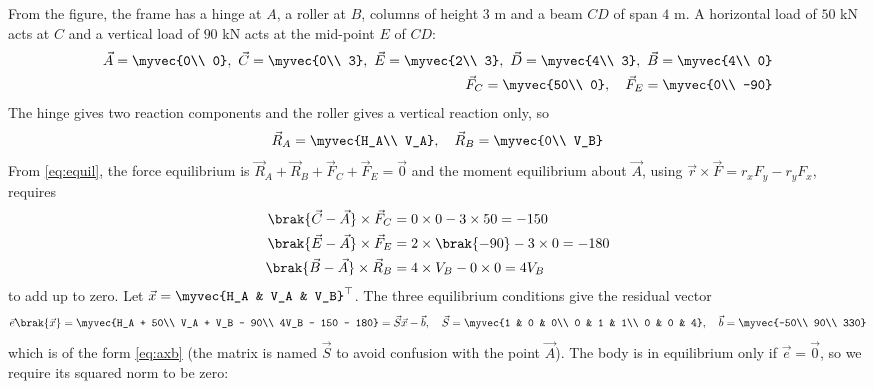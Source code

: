 \begin{enumerate}[label=\thesubsection.\arabic*, ref=\thesubsection.\theenumi, itemsep=0pt, leftmargin=*]
\solution From the figure, the frame has a hinge at $A$, a roller at $B$, columns of height $3$ m and a beam $CD$ of span $4$ m. A horizontal load of $50$ kN acts at $C$ and a vertical load of $90$ kN acts at the mid-point $E$ of $CD$:
\begin{align}
\vec{A} = \myvec{0\\ 0},\ \vec{C} = \myvec{0\\ 3},\ \vec{E} = \myvec{2\\ 3},\ \vec{D} = \myvec{4\\ 3},\ \vec{B} = \myvec{4\\ 0}\\
\vec{F}_C = \myvec{50\\ 0},\quad \vec{F}_E = \myvec{0\\ -90}
\end{align}
The hinge gives two reaction components and the roller gives a vertical reaction only, so
\begin{align}
\vec{R}_A = \myvec{H_A\\ V_A},\quad \vec{R}_B = \myvec{0\\ V_B}
\end{align}
From \eqref{eq:equil}, the force equilibrium is $\vec{R}_A + \vec{R}_B + \vec{F}_C + \vec{F}_E = \vec{0}$ and the moment equilibrium about $\vec{A}$, using $\vec{r}\times\vec{F} = r_xF_y - r_yF_x$, requires
\begin{align}
\brak{\vec{C} - \vec{A}}\times\vec{F}_C &= 0\times 0 - 3\times 50 = -150\\
\brak{\vec{E} - \vec{A}}\times\vec{F}_E &= 2\times\brak{-90} - 3\times 0 = -180\\
\brak{\vec{B} - \vec{A}}\times\vec{R}_B &= 4\times V_B - 0\times 0 = 4V_B
\end{align}
to add up to zero. Let $\vec{x} = \myvec{H_A & V_A & V_B}^\top$. The three equilibrium conditions give the residual vector
\begin{align}
\vec{e}\brak{\vec{x}} = \myvec{H_A + 50\\ V_A + V_B - 90\\ 4V_B - 150 - 180} = \vec{S}\vec{x} - \vec{b},\quad \vec{S} = \myvec{1 & 0 & 0\\ 0 & 1 & 1\\ 0 & 0 & 4},\quad \vec{b} = \myvec{-50\\ 90\\ 330}
\end{align}
which is of the form \eqref{eq:axb} (the matrix is named $\vec{S}$ to avoid confusion with the point $\vec{A}$). The body is in equilibrium only if $\vec{e} = \vec{0}$, so we require its squared norm to be zero:

\end{enumerate}
